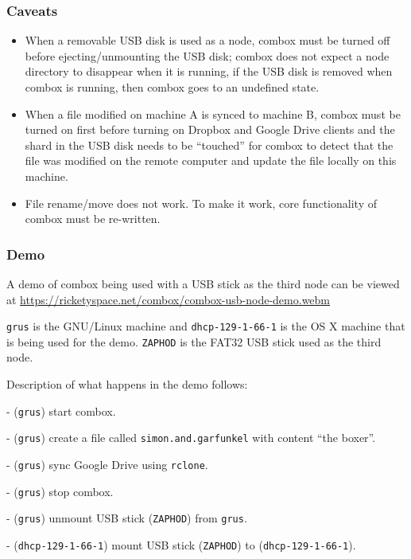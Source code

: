 \subsubsection{Caveats}

\begin{itemize}
\item When a removable USB disk is used as a node, combox must be
  turned off before ejecting/unmounting the USB disk; combox does not
  expect a node directory to disappear when it is running, if the USB
  disk is removed when combox is running, then combox goes to an
  undefined state.

\item When a file modified on machine A is synced to machine B, combox
  must be turned on first before turning on Dropbox and Google Drive
  clients and the shard in the USB disk needs to be ``touched'' for
  combox to detect that the file was modified on the remote computer
  and update the file locally on this machine.

\item File rename/move does not work. To make it work, core
  functionality of combox must be re-written.
\end{itemize}

\subsubsection{Demo}

A demo of combox being used with a USB stick as the third node can be
viewed at
\url{https://ricketyspace.net/combox/combox-usb-node-demo.webm}

\verb+grus+ is the GNU/Linux machine and \verb+dhcp-129-1-66-1+ is the
OS X machine that is being used for the demo. \verb+ZAPHOD+ is the
FAT32 USB stick used as the third node.

Description of what happens in the demo follows:

- (\verb+grus+) start combox.

- (\verb+grus+) create a file called \verb+simon.and.garfunkel+ with
content ``the boxer''.

- (\verb+grus+) sync Google Drive using \verb+rclone+.

- (\verb+grus+) stop combox.

- (\verb+grus+) unmount USB stick (\verb+ZAPHOD+) from \verb+grus+.

- (\verb+dhcp-129-1-66-1+) mount USB stick (\verb+ZAPHOD+) to
(\verb+dhcp-129-1-66-1+).

